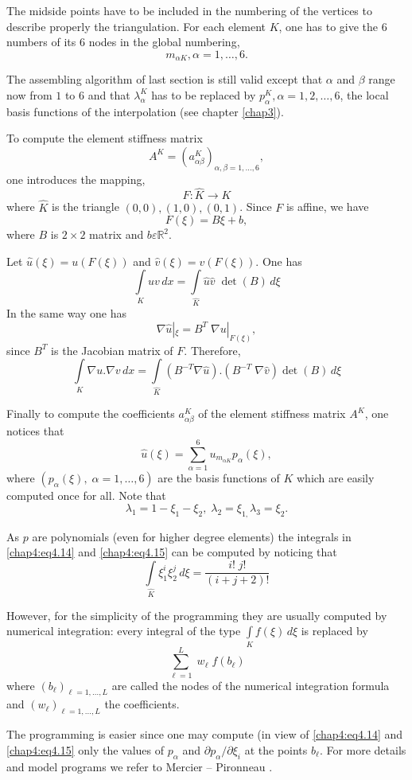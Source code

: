 The midside points have to be included in the numbering of the
vertices to describe properly the triangulation. For each element $K$,
one has to give the 6 numbers of its 6 nodes in the global numbering, 
$$
m_{\alpha K},\alpha =1,\ldots, 6.
$$\pageoriginale

The assembling algorithm of last section is still valid except that
$\alpha$ and $\beta$ range now from $1$ to $6$ and that
$\lambda_\alpha^K$ has to be replaced by $p_\alpha^K,\alpha
=1,2,\ldots,6$, the local basis functions of the interpolation (see
chapter \ref{chap3}).

To compute the element stiffness matrix
$$
A^K=\left(a_{\alpha\beta}^K\right)_{\alpha,\beta=1,\ldots,6},
$$
one introduces the mapping,
$$
F:\hat{K}\to K
$$
where $\hat{K}$ is the triangle $(0, 0), (1, 0), (0, 1)$. Since $F$ is
affine, we have 
$$
F(\xi)=B\xi +b,
$$
where $B$ is $2\times 2$ matrix and $b\varepsilon\mathbb{R}^2$.

Let $\hat{u}(\xi)=u(F(\xi))$ and $\hat{v}(\xi)=v(F(\xi))$. One has 
\begin{equation}\label{chap4:eq4.14}
\int\limits_K uv\,dx=\int\limits_{\hat{K}}\hat{u}\hat{v}\;\det(B)\,d\xi 
\end{equation}
In the same way one has 
$$
\nabla\hat{u}|_\xi =B^T\; \nabla u|_{F(\xi)},
$$
since $B^T$ is the Jacobian matrix of $F$. Therefore,
\begin{equation}\label{chap4:eq4.15}
\int\limits_K\nabla u.\nabla v\,dx=\int\limits_{\hat{K}}(B^{-T}\nabla
\hat{u}).(B^{-T} \;\nabla\hat{v})\det (B)\,d\xi
\end{equation}

Finally to compute the coefficients $a_{\alpha\beta}^K$ of the element
stiffness matrix $A^K$, one notices that 
$$
\hat{u}(\xi)=\sum\limits_{\alpha =1}^6u_{m_{\alpha K}}p_\alpha(\xi),
$$\pageoriginale
where $(p_\alpha(\xi),\; \alpha =1,\ldots,6)$ are the basis functions
of $K$ which are easily computed once for all. Note that 
$$
\lambda_1=1-\xi_1-\xi_2,\;\lambda_2=\xi_{1,}\lambda_3=\xi_2.
$$

As $p$ are polynomials (even for higher degree elements) the integrals
in \eqref{chap4:eq4.14} and \eqref{chap4:eq4.15} can be computed by
noticing that 
$$
\int\limits_{\hat{K}}\xi_1^i\xi_2^j\,d\xi=\frac{i!\;j!}{(i+j+2)!}
$$

However, for the simplicity of the programming they are usually
computed by numerical integration: every integral of the type
$\int\limits_K f(\xi)\,d\xi$ is replaced by 
$$
\sum\limits_{\ell =1}^L \;w_\ell\;f(b_\ell)
$$
where $(b_\ell)_{\ell =1,\ldots,L}$ are called the nodes of the
numerical integration formula and $(w_\ell)_{\ell =1,\ldots,L}$ the
coefficients.

The programming is easier since one may compute (in view of
\eqref{chap4:eq4.14} and \eqref{chap4:eq4.15} only the values of
$p_\alpha$ and $\partial p_\alpha/\partial\xi_i$ at the points
$b_\ell$. For more details and model programs we refer to Mercier --
Pironneau \cite{key32}.

